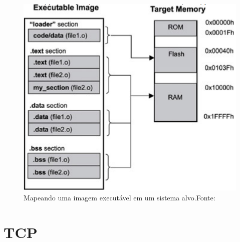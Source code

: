 \begin{figure}[H]
    \scriptsize
     \centering
     \includegraphics[scale=0.7]{dados/figuras/Linker4.png}
     \caption{Mapeando uma imagem executável em um sistema alvo.\newline Fonte:\cite{Qing2003}}
     \label{linker}
\end{figure}









\section{\textbf{TCP}}

